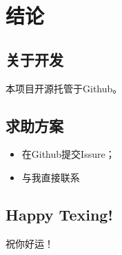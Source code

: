 \chapter{结论}
\section{关于开发}
本项目开源托管于Github。
\section{求助方案}
\begin{itemize}
	\item 在Github提交Issure；
	\item 与我直接联系
\end{itemize}
\section{Happy Texing!}
祝你好运！